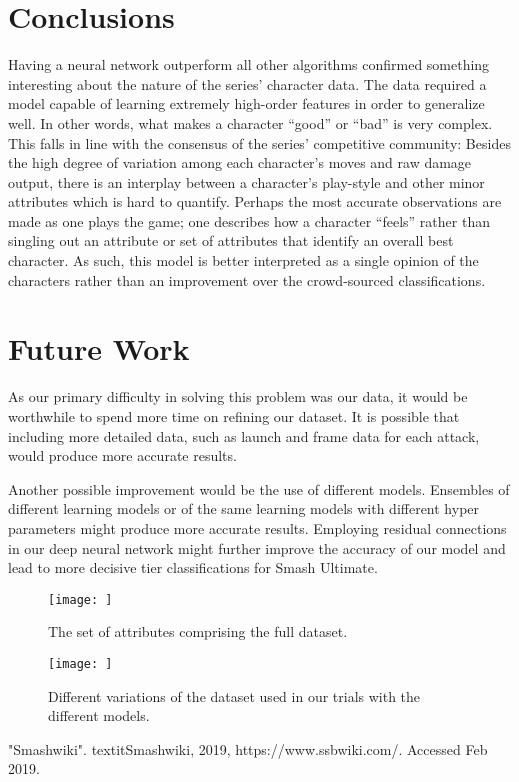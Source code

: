 \documentclass{article}
\begin{document}
\section{Conclusions}

Having a neural network outperform all other algorithms confirmed something interesting about the nature of the series’ character data. The data required a model capable of learning extremely high-order features in order to generalize well. In other words, what makes a character “good” or “bad” is very complex. This falls in line with the consensus of the series’ competitive community: Besides the high degree of variation among each character’s moves and raw damage output, there is an interplay between a character’s play-style and other minor attributes which is hard to quantify. Perhaps the most accurate observations are made as one plays the game; one describes how a character “feels” rather than singling out an attribute or set of attributes that identify an overall best character. As such, this model is better interpreted as a single opinion of the characters rather than an improvement over the crowd-sourced classifications.


\section{Future Work}

As our primary difficulty in solving this problem was our data, it would be worthwhile to spend more time on refining our dataset.
It is possible that including more detailed data, such as launch and frame data for each attack, would produce more accurate results.

Another possible improvement would be the use of different models.
Ensembles of different learning models or of the same learning models with different hyper parameters might produce more accurate results. Employing residual connections in our deep neural network might further improve the accuracy of our model and lead to more decisive tier classifications for Smash Ultimate.

\appendix

\begin{figure}[!htb]
    \centering
    \texttt{[image: ]}
    \caption{The set of attributes comprising the full dataset.}
    \label{fig:my_label}
\end{figure}

\begin{figure}[!htb]
    \centering
    \texttt{[image: ]}
    \caption{Different variations of the dataset used in our trials with the different models.}
    \label{fig:my_label}
\end{figure}


\begin{thebibliography}{1}
"Smashwiki". textit{Smashwiki}, 2019, https://www.ssbwiki.com/. Accessed Feb 2019.
\end{thebibliography}
\end{document}
